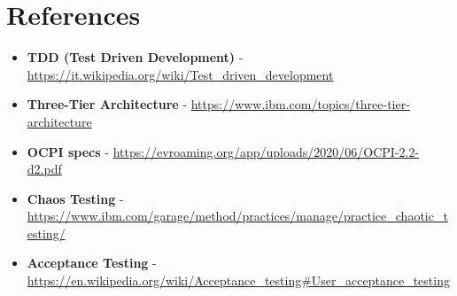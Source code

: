 \chapter{References}

\begin{itemize}
	\item \textbf{TDD (Test Driven Development)} - \url{https://it.wikipedia.org/wiki/Test_driven_development}
	\item \textbf{Three-Tier Architecture} - \url{https://www.ibm.com/topics/three-tier-architecture}
	\item \textbf{OCPI specs} - \url{https://evroaming.org/app/uploads/2020/06/OCPI-2.2-d2.pdf}
	\item \textbf{Chaos Testing} - \url{https://www.ibm.com/garage/method/practices/manage/practice_chaotic_testing/}
	\item \textbf{Acceptance Testing} - \url{https://en.wikipedia.org/wiki/Acceptance_testing#User_acceptance_testing}
\end{itemize}